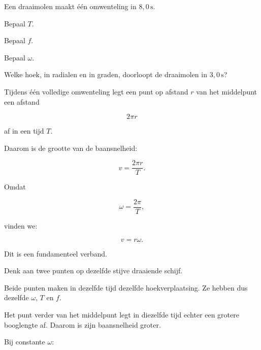 \documentclass{ximera}
\begin{document}
\begin{oefening}{\oefB\ESS}

Een draaimolen maakt één omwenteling in $8,0\,\mathrm{s}$.

\begin{question}
Bepaal $T$.
\end{question}

\begin{question}
Bepaal $f$.
\end{question}

\begin{question}
Bepaal $\omega$.
\end{question}

\begin{question}
Welke hoek, in radialen en in graden, doorloopt de draaimolen in
$3,0\,\mathrm{s}$?
\end{question}

\end{oefening}




Tijdens één volledige omwenteling legt een punt op afstand $r$ van het
middelpunt een afstand

\[
2\pi r
\]

af in een tijd $T$.

Daarom is de grootte van de baansnelheid:

\[
v=\frac{2\pi r}{T}.
\]

Omdat

\[
\omega=\frac{2\pi}{T},
\]

vinden we:

\[
\boxed{v=r\omega}.
\]

Dit is een fundamenteel verband.



Denk aan twee punten op dezelfde stijve draaiende schijf.

Beide punten maken in dezelfde tijd dezelfde hoekverplaatsing. Ze
hebben dus dezelfde $\omega$, $T$ en $f$.

Het punt verder van het middelpunt legt in diezelfde tijd echter een
grotere booglengte af. Daarom is zijn baansnelheid groter.

Bij constante $\omega$:
\end{document}

